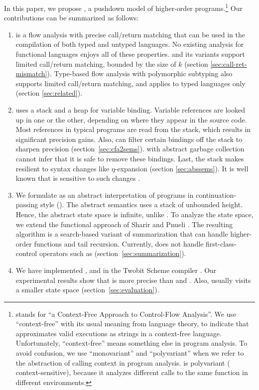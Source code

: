 \documentclass{LMCS}
\theoremstyle{definition} \newtheorem{property}[thm]{Property}
\begin{document}
In this paper, we propose \cfat{}, a pushdown model of higher-order 
programs.\footnote{\cfat{} stands for 
``a Context-Free Approach to Control-Flow Analysis''.
We use ``context-free'' with its usual meaning from language theory, to indicate
that \cfat{} approximates valid executions as strings in a context-free 
language.
Unfortunately, ``context-free'' means something else in program analysis.
To avoid confusion, we use ``monovariant'' and ``polyvariant'' when we refer to
the abstraction of calling context in program analysis.
\cfat{} is polyvariant (\aka{} context-sensitive), because it analyzes different
calls to the same function in different environments.
}
Our contributions can be summarized as follows:
\begin{enumerate}[$\bullet$]
\item
  \cfat{} is a flow analysis with precise call/return matching that can be used
  in the compilation of both typed and untyped languages.
  No existing analysis for functional languages enjoys all of these properties.
  \kcfa{} and its variants support lim\-it\-ed call/return matching, bounded by 
  the size of $k$ (section \ref{sec:call-ret-mismatch}).
  Type-based flow analysis with polymorphic subtyping \cite{diss/diku/96/mossin,
    conf/popl/01/rehof/typeflow} also supports limited call/return matching, and
  applies to typed languages only (section \ref{sec:related}).
\item  
  \cfat{} uses a stack and a heap for variable binding.
  Variable references are looked up in one or the other, depending on where they
  appear in the source code.
  Most ref\-er\-ences in typical programs are read from the stack, which results
  in significant pre\-ci\-sion gains. 
  Also, \cfat{} can filter certain bindings off the stack to sharpen 
  pre\-ci\-sion (section~\ref{sec:cfa2sems}).
  \kcfa{} with abstract garbage collection \cite{conf/icfp/06/might/gcfa}
  cannot infer that it is safe to remove these bindings.
  Last, the stack makes \cfat{} resilient to syntax changes like 
  $\eta$-expansion (section \ref{sec:abssems}).
  It is well known that \kcfa{} is sensitive to such changes
  \cite{journal/toplas/98/wright/polysplit, conf/icfp/08/vanhorn/kcfa}.
\item
  We formulate \cfat{} as an abstract interpretation of programs in 
  continuation-passing style (\cps{}).
  The abstract semantics uses a stack of unbounded height.
  Hence, the abstract state space is infinite, unlike \kcfa{}.
  To analyze the state space, we extend the functional approach of Sharir and
  Pnueli \cite{book/flowanalysis/81/sharir/interproc}.
  The resulting algorithm is a search-based variant of summarization that can
  handle higher-order functions and tail recursion.
  Currently, \cfat{} does not handle first-class-control operators such 
  as  (section~\ref{sec:summarization}).
\item
  We have implemented ,  and \cfat{} in the Twobit Scheme 
  compiler \cite{conf/lfp/94/clinger/larceny}.
  Our experimental results show that \cfat{} is more precise than  and 
  .
  Also, \cfat{} usually visits a smaller state space 
  (section~\ref{sec:evaluation}).
\end{enumerate}
\end{document}
